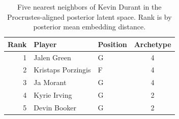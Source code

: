 \begin{table}[htbp]
  \centering\small
  \begin{tabular}{rllc}
    \toprule
    Rank & Player & Position & Archetype \\
    \midrule
    1 & Jalen Green & G & 4 \\
    2 & Kristaps Porzingis & F & 4 \\
    3 & Ja Morant & G & 4 \\
    4 & Kyrie Irving & G & 2 \\
    5 & Devin Booker & G & 2 \\
    \bottomrule
  \end{tabular}
  \caption{Five nearest neighbors of Kevin Durant in the Procrustes-aligned posterior latent space. Rank is by posterior mean embedding distance.}
  \label{tab:Kevin_Durant_neighbors}
\end{table}

